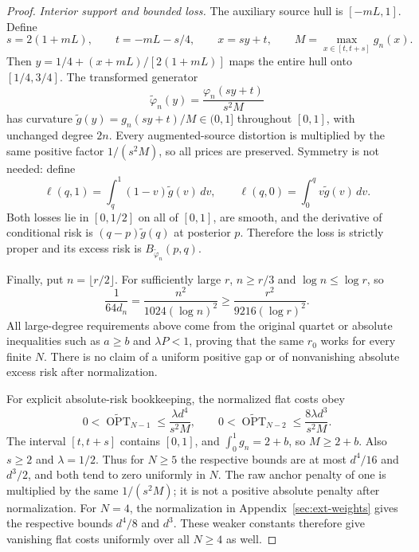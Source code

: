 \begin{proof}
\par\medskip\noindent\textit{Interior support and bounded loss.} 
The auxiliary source hull is $[-mL,1]$. Define
\[
 s=2(1+mL),\qquad t=-mL-s/4,
 \qquad x=sy+t,
 \qquad M=\max_{x\in[t,t+s]}g_n(x).
\]
Then $y=1/4+(x+mL)/[2(1+mL)]$ maps the entire hull onto
$[1/4,3/4]$. The transformed generator
\[
 \widetilde\varphi_n(y)=\frac{\varphi_n(sy+t)}{s^2M}
\]
has curvature $\widetilde g(y)=g_n(sy+t)/M\in(0,1]$ throughout
$[0,1]$, with unchanged degree $2n$. Every augmented-source distortion
is multiplied by the same positive factor $1/(s^2M)$, so all prices
are preserved. Symmetry is not needed: define
\[
 \ell(q,1)=\int_q^1(1-v)\widetilde g(v)\,dv,
 \qquad
 \ell(q,0)=\int_0^q v\widetilde g(v)\,dv.
\]
Both losses lie in $[0,1/2]$ on all of $[0,1]$, are smooth, and the
derivative of conditional risk is $(q-p)\widetilde g(q)$ at posterior
$p$. Therefore the loss is strictly proper and its excess risk is
$B_{\widetilde\varphi_n}(p,q)$.

Finally, put $n=\lfloor r/2\rfloor$. For sufficiently large $r$,
$n\ge r/3$ and $\log n\le\log r$, so
\[
 \frac1{64d_n}
 =\frac{n^2}{1024(\log n)^2}
 \ge\frac{r^2}{9216(\log r)^2}.
\]
All large-degree requirements above come from the original quartet or
absolute inequalities such as $a\ge b$ and $\lambda P<1$, proving
that the same $r_0$ works for every finite $N$. There is no claim of
a uniform positive gap or of nonvanishing absolute excess risk after
normalization.

For explicit absolute-risk bookkeeping, the normalized flat costs obey
\[
 0<\widetilde{\operatorname{OPT}}_{N-1}
 \le\frac{\lambda d^4}{s^2M},\qquad
 0<\widetilde{\operatorname{OPT}}_{N-2}
 \le\frac{8\lambda d^3}{s^2M}.
\]
The interval $[t,t+s]$ contains $[0,1]$, and
$\int_0^1g_n=2+b$, so $M\ge2+b$. Also $s\ge2$ and
$\lambda=1/2$. Thus for $N\ge5$ the respective bounds are at most
$d^4/16$ and $d^3/2$, and both tend to zero uniformly in $N$.
The raw anchor penalty of one is multiplied by the same
$1/(s^2M)$; it is not a positive absolute penalty after normalization.
For $N=4$, the normalization in Appendix~\ref{sec:ext-weights} gives the
respective bounds $d^4/8$ and $d^3$. These weaker constants therefore
give vanishing flat costs uniformly over all $N\ge4$ as well.

\end{proof}
